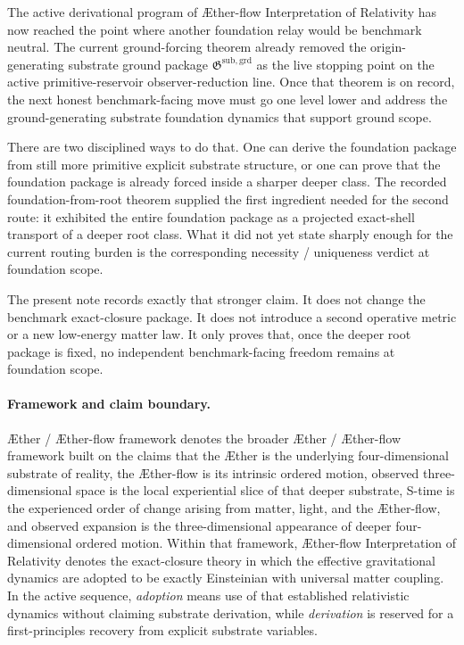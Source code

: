 \documentclass[11pt]{article}
\newcommand{\Aether}{\AE{}ther}
\newcommand{\Aflow}{\AE{}ther-flow}
\newcommand{\TheoryName}{\Aflow{} Interpretation of Relativity}
\newcommand{\TheoryProgram}{\Aether{} / \Aflow{} framework}
\newcommand{\GroundPackage}{\mathfrak G^{\mathrm{sub,grd}}}
\begin{document}
The active derivational program of \TheoryName{} has now reached the point where another foundation relay would be benchmark neutral. The current ground-forcing theorem already removed the origin-generating substrate ground package \(\GroundPackage\) as the live stopping point on the active primitive-reservoir observer-reduction line. Once that theorem is on record, the next honest benchmark-facing move must go one level lower and address the ground-generating substrate foundation dynamics that support ground scope.

There are two disciplined ways to do that. One can derive the foundation package from still more primitive explicit substrate structure, or one can prove that the foundation package is already forced inside a sharper deeper class. The recorded foundation-from-root theorem supplied the first ingredient needed for the second route: it exhibited the entire foundation package as a projected exact-shell transport of a deeper root class. What it did not yet state sharply enough for the current routing burden is the corresponding necessity / uniqueness verdict at foundation scope.

The present note records exactly that stronger claim. It does not change the benchmark exact-closure package. It does not introduce a second operative metric or a new low-energy matter law. It only proves that, once the deeper root package is fixed, no independent benchmark-facing freedom remains at foundation scope.

\paragraph{Framework and claim boundary.}
\TheoryProgram{} denotes the broader \Aether{} / \Aflow{} framework built on the claims that the \Aether{} is the underlying four-dimensional substrate of reality, the \Aflow{} is its intrinsic ordered motion, observed three-dimensional space is the local experiential slice of that deeper substrate, S-time is the experienced order of change arising from matter, light, and the \Aflow{}, and observed expansion is the three-dimensional appearance of deeper four-dimensional ordered motion. Within that framework, \TheoryName{} denotes the exact-closure theory in which the effective gravitational dynamics are adopted to be exactly Einsteinian with universal matter coupling. In the active sequence, \emph{adoption} means use of that established relativistic dynamics without claiming substrate derivation, while \emph{derivation} is reserved for a first-principles recovery from explicit substrate variables.
\end{document}
